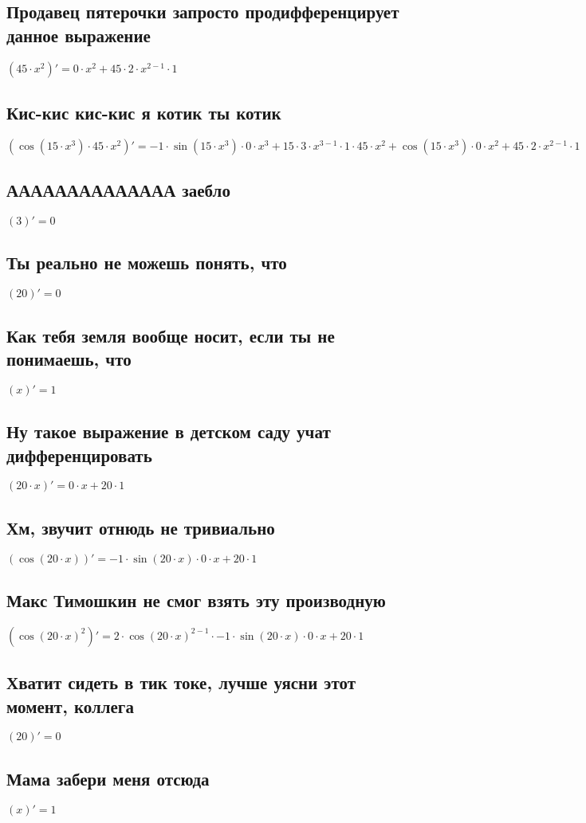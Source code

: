 \documentclass[12pt]{article}
\begin{document}
\subsection{Продавец пятерочки запросто продифференцирует данное выражение}
$(45 \cdot x^{2})' = 0 \cdot x^{2} + 45 \cdot 2 \cdot x^{2 - 1} \cdot 1$
\subsection{Кис-кис кис-кис я котик ты котик}
$(\cos(15 \cdot x^{3}) \cdot 45 \cdot x^{2})' = -1 \cdot \sin(15 \cdot x^{3}) \cdot 0 \cdot x^{3} + 15 \cdot 3 \cdot x^{3 - 1} \cdot 1 \cdot 45 \cdot x^{2} + \cos(15 \cdot x^{3}) \cdot 0 \cdot x^{2} + 45 \cdot 2 \cdot x^{2 - 1} \cdot 1$
\subsection{АААААААААААААА заебло}
$(3)' = 0$
\subsection{Ты реально не можешь понять, что}
$(20)' = 0$
\subsection{Как тебя земля вообще носит, если ты не понимаешь, что}
$(x)' = 1$
\subsection{Ну такое выражение в детском саду учат дифференцировать}
$(20 \cdot x)' = 0 \cdot x + 20 \cdot 1$
\subsection{Хм, звучит отнюдь не тривиально}
$(\cos(20 \cdot x))' = -1 \cdot \sin(20 \cdot x) \cdot 0 \cdot x + 20 \cdot 1$
\subsection{Макс Тимошкин не смог взять эту производную}
$(\cos(20 \cdot x)^{2})' = 2 \cdot \cos(20 \cdot x)^{2 - 1} \cdot -1 \cdot \sin(20 \cdot x) \cdot 0 \cdot x + 20 \cdot 1$
\subsection{Хватит сидеть в тик токе, лучше уясни этот момент, коллега}
$(20)' = 0$
\subsection{Мама забери меня отсюда}
$(x)' = 1$
\end{document}
